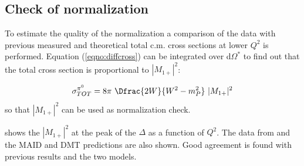 \subsection{Check of normalization}
To estimate the quality of the normalization a comparison of the data with
previous measured and theoretical total c.m. cross sections at lower $Q^2$ is performed.
Equation (\ref{eqno:diffcross}) can be  integrated
over d$\Omega ^*$ to find out that the total cross section is proportional to
$|M_{1+}|^2$:

\begin{equation}
\sigma_{TOT}^{\pi^0} = 8\pi\, \, \Dfrac{2W}{W^2-m_P^2} \,\, |M_{1+}|^2
\end{equation}
so that $|M_{1+}|^2$ can be used as normalization check.

 shows the $|M_{1+}|^2$ at the peak of the $\Delta$ as a function of $Q^2$.
The data from \cite{bib:frolov} and the MAID and DMT predictions are also shown.
Good agreement is found with previous results and the two models.

